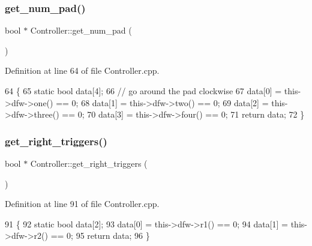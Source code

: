\subsubsection{\texorpdfstring{get\+\_\+num\+\_\+pad()}{get\_num\_pad()}}
{\footnotesize\ttfamily bool $\ast$ Controller\+::get\+\_\+num\+\_\+pad (\begin{DoxyParamCaption}{ }\end{DoxyParamCaption})}



Definition at line 64 of file Controller.\+cpp.


\begin{DoxyCode}
64                               \{
65     \textcolor{keyword}{static} \textcolor{keywordtype}{bool} data[4];
66     \textcolor{comment}{// go around the pad clockwise}
67     data[0] = this->dfw->one() == 0;
68     data[1] = this->dfw->two() == 0;
69     data[2] = this->dfw->three() == 0;
70     data[3] = this->dfw->four() == 0;
71     \textcolor{keywordflow}{return} data;
72 \}
\end{DoxyCode}
\mbox{\label{class_controller_a074d3c80ec11e8e64a7d5d0bb7ff06db}} 
\subsubsection{\texorpdfstring{get\+\_\+right\+\_\+triggers()}{get\_right\_triggers()}}
{\footnotesize\ttfamily bool $\ast$ Controller\+::get\+\_\+right\+\_\+triggers (\begin{DoxyParamCaption}{ }\end{DoxyParamCaption})}



Definition at line 91 of file Controller.\+cpp.


\begin{DoxyCode}
91                                      \{
92     \textcolor{keyword}{static} \textcolor{keywordtype}{bool} data[2];
93     data[0] = this->dfw->r1() == 0;
94     data[1] = this->dfw->r2() == 0;
95     \textcolor{keywordflow}{return} data;
96 \}
\end{DoxyCode}
\mbox{\label{class_controller_a0bd70e25e112c655ba578f147af9ce11}} 
